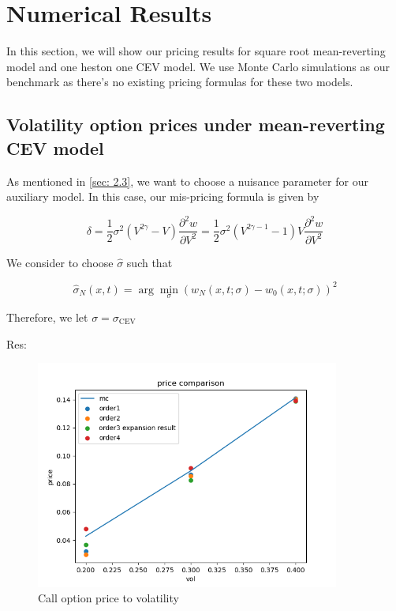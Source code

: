 \chapter{Numerical Results}

In this section, we will show our pricing results for square root mean-reverting model and one heston one CEV model. We use Monte Carlo simulations as our benchmark as there's no existing pricing formulas for these two models.

\section{Volatility option prices under mean-reverting CEV model}

As mentioned in \ref{sec: 2.3}, we want to choose a nuisance parameter for our auxiliary model. In this case, our mis-pricing formula is given by

$$
\delta = \frac{1}{2} \sigma^{2} (V^{2\gamma} - V) \frac{\partial^{2} w}{\partial V^{2}} = \frac{1}{2} \sigma^{2} (V^{2\gamma-1} -1)V \frac{\partial^{2} w}{\partial V^{2}}
$$

We consider to choose $\hat{\sigma}$ such that

$$
\hat{\sigma}_{N}(x, t)=\arg \min _{\sigma}\left(w_{N}(x, t ; \sigma)-w_{0}(x, t ; \sigma)\right)^{2}
$$

\noindent Therefore, we let $\sigma = \sigma_{\text{CEV}}$

\noindent Res:


\begin{figure}[ht]
    \centering
    \includegraphics[width=10cm]{./figures/cev1.png}
    \caption{Call option price to volatility}\label{call2t}
\end{figure}